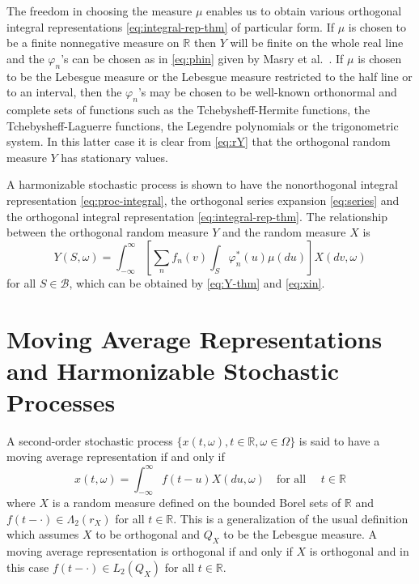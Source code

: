 \documentclass{article}
\begin{document}
The freedom in choosing the measure $\mu$ enables us to obtain various
orthogonal integral representations \eqref{eq:integral-rep-thm} of particular
form. If $\mu$ is chosen to be a finite nonnegative measure on $\mathbb{R}$
then $Y$ will be finite on the whole real line and the $\varphi_n$'s can be
chosen as in \eqref{eq:phin} given by Masry et al.~{\cite{masry1968}}. If
$\mu$ is chosen to be the Lebesgue measure or the Lebesgue measure restricted
to the half line or to an interval, then the $\varphi_n$'s may be chosen to be
well-known orthonormal and complete sets of functions such as the
Tchebysheff-Hermite functions, the Tchebysheff-Laguerre functions, the
Legendre polynomials or the trigonometric system. In this latter case it is
clear from \eqref{eq:rY} that the orthogonal random measure $Y$ has stationary
values.

A harmonizable stochastic process is shown to have the nonorthogonal integral
representation \eqref{eq:proc-integral}, the orthogonal series expansion
\eqref{eq:series} and the orthogonal integral representation
\eqref{eq:integral-rep-thm}. The relationship between the orthogonal random
measure $Y$ and the random measure $X$ is
\begin{equation}
  Y (S, \omega) = \int_{- \infty}^{\infty} \left[ \sum_n f_n (v) \int_S
  \varphi_n^{\ast} (u) \mu (du) \right] X (dv, \omega) \label{eq:Y-X}
\end{equation}
for all $S \in \mathscr{B}$, which can be obtained by \eqref{eq:Y-thm} and
\eqref{eq:xin}.

\section{Moving Average Representations and Harmonizable Stochastic
Processes}\label{sec:moving-avg}

A second-order stochastic process $\{x (t, \omega), t \in \mathbb{R}, \omega
\in \Omega\}$ is said to have a moving average representation if and only if
\begin{equation}
  x (t, \omega) = \int_{- \infty}^{\infty} f (t - u) X (du, \omega)  \quad
  \text{for all } \quad t \in \mathbb{R} \label{eq:moving-avg}
\end{equation}
where $X$ is a random measure defined on the bounded Borel sets of
$\mathbb{R}$ and $f (t - \cdot) \in \Lambda_2 (r_X)$ for all $t \in
\mathbb{R}$. This is a generalization of the usual definition which assumes
$X$ to be orthogonal and $Q_X$ to be the Lebesgue measure. A moving average
representation is orthogonal if and only if $X$ is orthogonal and in this case
$f (t - \cdot) \in L_2 (Q_X)$ for all $t \in \mathbb{R}$.
\end{document}
